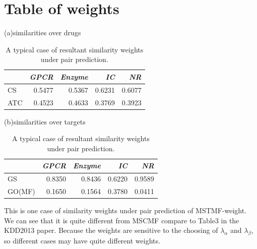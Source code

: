 \documentclass{article}
\begin{document}
\section{Table of weights}

\begin{table}[h]
\caption{A typical case of resultant similarity weights under
pair prediction.}\label{weight_table}
(a)similarities over drugs \\
\begin{tabular}{lrrrr}
\toprule
 & \textit{GPCR} & \textit{Enzyme} & \textit{IC} & \textit{NR} \\
\midrule
CS & 0.5477 & 0.5367 & 0.6231 & 0.6077 \\
ATC& 0.4523 & 0.4633 & 0.3769 & 0.3923\\
\bottomrule
\end{tabular}

(b)similarities over targets \\
\begin{tabular}{lrrrr}
\toprule
 & \textit{GPCR} & \textit{Enzyme} & \textit{IC} & \textit{NR} \\
\midrule
GS & 0.8350 & 0.8436 & 0.6220 & 0.9589 \\
GO(MF)& 0.1650 & 0.1564 & 0.3780 & 0.0411\\
\bottomrule
\end{tabular}

\end{table}

This is one case of similarity weights under pair prediction of MSTMF-weight. We can see that it is quite different from MSCMF compare to Table3 in the KDD2013 paper. Because the weights are sensitive to the choosing of $\lambda_\alpha$ and $\lambda_\beta$, so different cases may have quite different weights.
\end{document}
